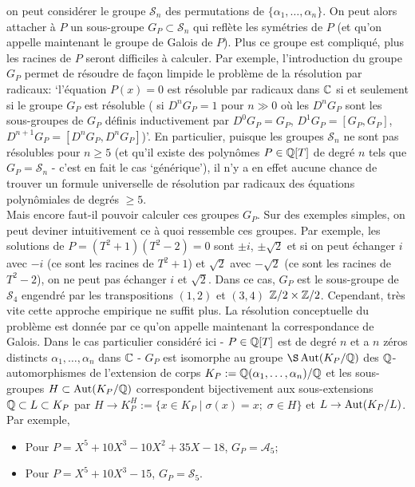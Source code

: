  on peut considérer le groupe   $\mathcal{S}_n$ des permutations de $\lbrace \alpha_1,\dots, \alpha_n\rbrace$.  On peut alors attacher à $P$ un sous-groupe $G_P\subset \mathcal{S}_n$ qui reflète les symétries de $P$ (et qu'on appelle maintenant le groupe de Galois de $P$). Plus ce groupe est compliqué, plus les racines de $P$ seront difficiles à calculer. Par exemple, l'introduction du groupe $G_P$ permet de résoudre de façon limpide le problème de la résolution par radicaux: `l'équation $P(x)=0$ est résoluble par radicaux dans $\mathbb{C}$ si et seulement si le groupe $G_P$ est résoluble (\ie{} si $D^nG_P=1$ pour $n\gg 0$ où les $D^nG_P$  sont  les sous-groupes de $G_P $ définis inductivement par $D^0G_P=G_P$, $D^1G_P=[G_P,G_P]$, $D^{n+1} G_P= [D^nG_P,D^nG_P]$)'. En particulier, puisque les groupes $\mathcal{S}_n$ ne sont pas résolubles pour $n\geq 5$ (et qu'il existe des polynômes $P\in \mathbb{Q}[T]$ de degré $n$ tels que $G_P=\mathcal{S}_n$ - c'est en fait le cas `générique'), il n'y a en effet aucune chance de trouver un formule universelle de résolution par radicaux des équations polynômiales de degrés $\geq 5$.\\

 Mais encore faut-il pouvoir calculer ces groupes $G_P$. Sur des exemples simples, on peut deviner intuitivement ce à quoi ressemble ces groupes. Par exemple, les solutions de  $P=(T^2+1)(T^2-2)=0$ sont $\pm i$, $\pm \sqrt{2}$ et si on peut échanger $i$ avec $-i$ (ce sont les racines de $T^2+1$) et $\sqrt{2}$ avec $-\sqrt{2}$ (ce sont les racines de $T^2-2$), on ne peut pas échanger $i$ et $\sqrt{2}$. Dans ce cas, $G_P$ est le sous-groupe de $\mathcal{S}_4$ engendré par les transpositions $(1,2)$ et $(3,4)$ \ie{}  $\mathbb{Z}/2\times \mathbb{Z}/2$. Cependant, très vite  cette approche empirique ne suffit plus. La résolution conceptuelle du problème est donnée par ce qu'on appelle maintenant la correspondance de Galois. Dans le cas particulier considéré ici - $P\in \mathbb{Q}[T]$ est de degré $n$ et a $n$ zéros distincts $\alpha_1,\dots,\alpha_n$ dans  $\mathbb{C}$ - $G_P$ est isomorphe au groupe $\S\SAut(K_P/\Q)$  des $\mathbb{Q}$-automorphismes de l'extension de corps $K_P:=\mathbb{Q}(\alpha_1,\dots,\alpha_n)/\mathbb{Q}$ et les sous-groupes    $H\subset \operatorname{Aut}(K_P/\mathbb{Q})$ correspondent bijectivement aux  sous-extensions $\mathbb{Q}\subset L\subset K_P $ par $H\rightarrow K_P^H:=\lbrace x\in K_P\;|\; \sigma (x)=x;\; \sigma\in H\rbrace$ et $L\rightarrow \operatorname{Aut}(K_P/L)$. Par exemple,
\begin{itemize}
\item Pour $P=X^5+10X^3-10X^2+35X-18$, $G_P=\mathcal{A}_5$;
\item Pour $P=X^5+10X^3-15$, $G_P=\mathcal{S}_5$.
\end{itemize}







